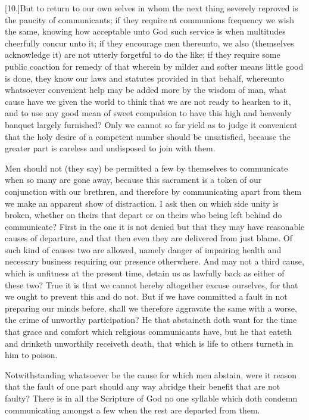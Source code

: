 [10.]But to return to our own selves in whom the next thing severely reproved is the paucity of communicants; if they require at communions frequency we wish the same, knowing how acceptable unto God such service is when multitudes cheerfully concur unto it; if they encourage men thereunto, we also (themselves acknowledge it) are not utterly forgetful to do the like; if they require some public coaction for remedy of that wherein by milder and softer means little good is done, they know our laws and statutes provided in that behalf, whereunto whatsoever convenient help may be added more by the wisdom of man, what cause  have we given the world to think that we are not ready to hearken to it, and to use any good mean of sweet compulsion to have this high and heavenly banquet largely furnished? Only we cannot so far yield as to judge it convenient that the holy desire of a competent number should be unsatisfied, because the greater part is careless and undisposed to join with them.

Men should not (they say) be permitted a few by themselves to communicate when so many are gone away, because this sacrament is a token of our conjunction with our brethren, and therefore by communicating apart from them we make an apparent show of distraction. I ask then on which side unity is broken, whether on theirs that depart or on theirs who being left behind do communicate? First in the one it is not denied but that they may have reasonable causes of departure, and that then even they are delivered from just blame. Of such kind of causes two are allowed, namely danger of impairing health and necessary business requiring our presence otherwhere. And may not a third cause, which is unfitness at the present time, detain us as lawfully back as either of these two? True it is that we cannot hereby altogether excuse ourselves, for that we ought to prevent this and do not. But  if we have committed a fault in not preparing our minds before, shall we therefore aggravate the same with a worse, the crime of unworthy participation?
 He that abstaineth doth want for the time that grace and comfort which religious communicants have, but he that eateth and drinketh unworthily receiveth death, that which is life to others turneth in him to poison.

Notwithstanding whatsoever be the cause for which men abstain, were it reason that the fault of one part should any way abridge their benefit that are not faulty? There is in all the Scripture of God no one syllable which doth condemn communicating amongst a few when the rest are departed from them.


